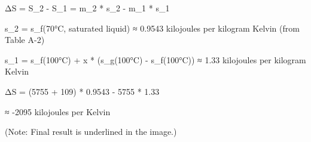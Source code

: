 ΔS = S_2 - S_1 = m_2 * s_2 - m_1 * s_1  

s_2 = s_f(70°C, saturated liquid) ≈ 0.9543 kilojoules per kilogram Kelvin (from Table A-2)  

s_1 = s_f(100°C) + x * (s_g(100°C) - s_f(100°C)) ≈ 1.33 kilojoules per kilogram Kelvin  

ΔS = (5755 + 109) * 0.9543 - 5755 * 1.33  

≈ -2095 kilojoules per Kelvin  

(Note: Final result is underlined in the image.)